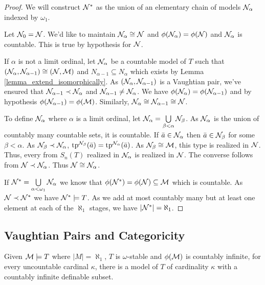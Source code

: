 \begin{proof}
We will construct \(\mathcal{N}^*\) as the union of an elementary chain of models \(\mathcal{N}_\alpha\) indexed by \(\omega_1\).

Let \(\mathcal{N}_0 = \mathcal{N}\). 
We'd like to maintain \(\mathcal{N}_\alpha \cong \mathcal{N}\) and \(\phi(\mathcal{N}_\alpha) = \phi(\mathcal{N})\) and \(\mathcal{N}_\alpha\) is countable. 
This is true by hypothesis for \(\mathcal{N}\).

If \(\alpha\) is not a limit ordinal, let \(\mathcal{N}_{\alpha}\) be a countable model of \(T\) such that \((\mathcal{N}_{\alpha}, \mathcal{N}_{\alpha-1}) \cong (\mathcal{N}, \mathcal{M})\) and \(N_{\alpha-1} \subseteq N_\alpha\) which exists by Lemma \ref{lemma_extend_isomorphically}. 
As \((\mathcal{N}_{\alpha}, \mathcal{N}_{\alpha-1})\) is a Vaughtian pair, we've ensured that \(\mathcal{N}_{\alpha-1} \prec \mathcal{N}_{\alpha}\) and \(\mathcal{N}_{\alpha-1} \neq \mathcal{N}_{\alpha}\).
We have \(\phi(\mathcal{N}_{\alpha}) = \phi(\mathcal{N}_{\alpha-1})\) and by hypothesis \(\phi(\mathcal{N}_{\alpha-1}) = \phi(\mathcal{M})\). 
Similarly,  \(\mathcal{N}_{\alpha} \cong \mathcal{N}_{\alpha-1} \cong \mathcal{N}\). 

To define \(\mathcal{N}_\alpha\) where \(\alpha\) is a limit ordinal, let \(\mathcal{N}_\alpha = \bigcup\limits_{\beta < \alpha}\mathcal{N}_\beta\). 
As \(\mathcal{N}_\alpha\) is the union of countably many countable sets, it is countable. 
If \(\bar{a} \in \mathcal{N}_\alpha\) then \(\bar{a} \in \mathcal{N}_\beta\) for some \(\beta < \alpha\). 
As \(\mathcal{N}_\beta \prec \mathcal{N}_\alpha\), \(\text{tp}^{\mathcal{N}_\beta}(\bar{a}) = \text{tp}^{\mathcal{N}_\alpha}(\bar{a})\). 
As \(\mathcal{N}_\beta \cong \mathcal{M}\), this type is realized in \(\mathcal{N}\).
Thus, every from \(S_n(T)\) realized in \(\mathcal{N}_\alpha\) is realized in \(\mathcal{N}\). 
The converse follows from \(\mathcal{N} \prec \mathcal{N}_\alpha\). 
Thus \(\mathcal{N} \cong \mathcal{N}_\alpha\).

If \(\mathcal{N}^* = \bigcup\limits_{\alpha < \omega_1}\mathcal{N}_\alpha\) we know that \(\phi(\mathcal{N}^*) = \phi(\mathcal{N}) \subseteq \mathcal{M}\) which is countable.
As \(\mathcal{N} \prec \mathcal{N}^*\) we have \(\mathcal{N}^* \models T\).  
As we add at most countably many but at least one element at each of the \(\aleph_1\) stages, we have \(|\mathcal{N}^*| = \aleph_1\).
\end{proof}

\subsection{Vaughtian Pairs and Categoricity}

\begin{theorem}\label{theorem_uncountable_vaughtian_pairs}
Given \(\mathcal{M} \models T\) where \(|M| = \aleph_1\), \(T\) is \(\omega\)-stable and \(\phi(\mathcal{M})\) is countably infinite, for every uncountable cardinal \(\kappa\), there is a model of \(T\) of cardinality \(\kappa\) with a countably infinite definable subset.  
\end{theorem}

